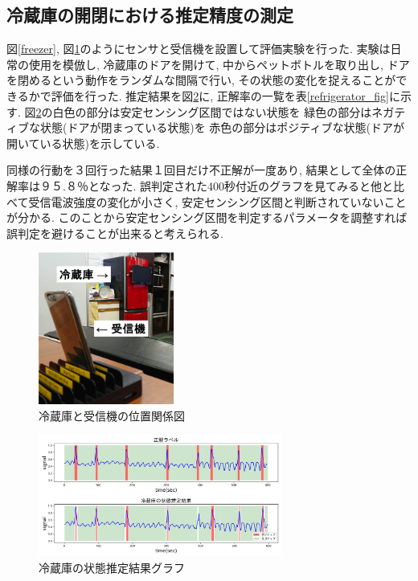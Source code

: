 \documentclass[Japanese]{dicomopapers}
\begin{document}
\subsection{冷蔵庫の開閉における推定精度の測定}
図\ref{freezer}, 図\ref{refrigerator_position}のようにセンサと受信機を設置して評価実験を行った.
実験は日常の使用を模倣し, 冷蔵庫のドアを開けて, 中からペットボトルを取り出し, ドアを閉めるという動作をランダムな間隔で行い, その状態の変化を捉えることができるかで評価を行った.
推定結果を図\ref{refrigerator_graph}に, 正解率の一覧を表\ref{refrigerator_fig}に示す.
図\ref{refrigerator_graph}の白色の部分は安定センシング区間ではない状態を 緑色の部分はネガティブな状態(ドアが閉まっている状態)を 赤色の部分はポジティブな状態(ドアが開いている状態)を示している.

同様の行動を３回行った結果１回目だけ不正解が一度あり, 結果として全体の正解率は９５.８％となった.
誤判定された400秒付近のグラフを見てみると他と比べて受信電波強度の変化が小さく, 安定センシング区間と判断されていないことが分かる.
このことから安定センシング区間を判定するパラメータを調整すれば誤判定を避けることが出来ると考えられる.

\begin{figure}[ht]
    \centering
    \includegraphics[height=5cm]{refrigerator_position.png}
    \caption{冷蔵庫と受信機の位置関係図}
    \label{refrigerator_position}
\end{figure}

\begin{figure}[ht]
    \centering
    \includegraphics[width=8cm]{refrigerator_graph.png}
    \caption{冷蔵庫の状態推定結果グラフ}
    \label{refrigerator_graph}
\end{figure}
\end{document}
